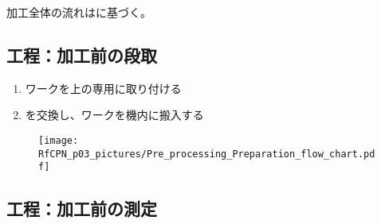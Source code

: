 




加工全体の流れはに基づく。


\subsection{工程：加工前の段取}
\begin{enumerate}[label*=\sarrow]
\item ワークを\Table 上の専用\Jig に取り付ける
\item \Palette を交換し、ワークを機内に搬入する
\end{enumerate}


\begin{figure}[h]%
\begin{FigShortbox}[valign=top]%
\texttt{[image: RfCPN\_p03\_pictures/Pre\_processing\_Preparation\_flow\_chart.pdf]}%
\setlength{\abovecaptionskip}{10pt}%
\end{FigShortbox}%
\end{figure}%


\clearpage
\subsection{工程：加工前の測定}

